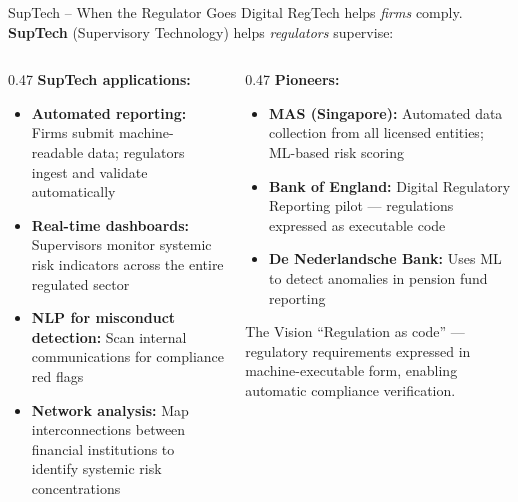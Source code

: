 \begin{frame}{SupTech -- When the Regulator Goes Digital}
  RegTech helps \textit{firms} comply. \textcolor{mlpurple}{\textbf{SupTech}}
  (Supervisory Technology) helps \textit{regulators} supervise:

  \vspace{0.5em}
  \begin{columns}[T]
    \begin{column}{0.47\textwidth}
      \textcolor{mlpurple}{\textbf{SupTech applications:}}
      \begin{itemize}
        \item \textbf{Automated reporting:} Firms submit machine-readable
              data; regulators ingest and validate automatically
        \item \textbf{Real-time dashboards:} Supervisors monitor systemic
              risk indicators across the entire regulated sector
        \item \textbf{NLP for misconduct detection:} Scan internal
              communications for compliance red flags
        \item \textbf{Network analysis:} Map interconnections between
              financial institutions to identify systemic risk concentrations
      \end{itemize}
    \end{column}
    \begin{column}{0.47\textwidth}
      \textcolor{mlblue}{\textbf{Pioneers:}}
      \begin{itemize}
        \item \textbf{MAS (Singapore):} Automated data collection from
              all licensed entities; ML-based risk scoring
        \item \textbf{Bank of England:} Digital Regulatory Reporting pilot ---
              regulations expressed as executable code
        \item \textbf{De Nederlandsche Bank:} Uses ML to detect anomalies
              in pension fund reporting
      \end{itemize}
      \vspace{0.3em}
      \begin{block}{The Vision}
        ``\textcolor{mlpurple}{Regulation as code}'' --- regulatory
        requirements expressed in machine-executable form, enabling
        automatic compliance verification.
      \end{block}
    \end{column}
  \end{columns}
\end{frame}


